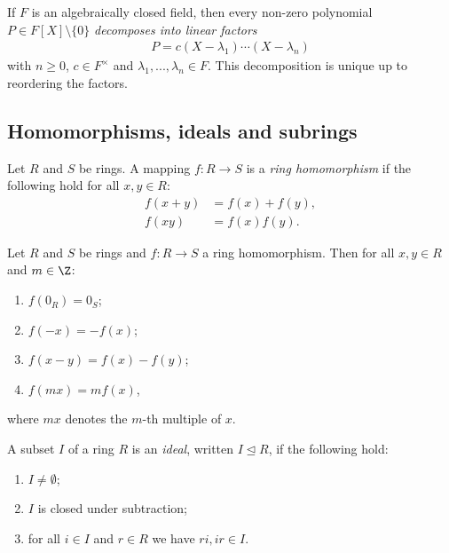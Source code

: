 \documentclass{article}
\begin{document}
\begin{theorem}[Notes 3.3.14]
    If $F$ is an algebraically closed field, then every non-zero polynomial
    $P\in F[X]\setminus\{0\}$ \emph{decomposes into linear factors}
    \begin{align*}
        P=c(X-\lambda_1)\cdots(X-\lambda_n)
    \end{align*} 
    with $n\geq 0$, $c\in F^\times$ and $\lambda_1,...,\lambda_n\in F$. This 
    decomposition is unique up to reordering the factors.
\end{theorem}

\subsection{Homomorphisms, ideals and subrings}

\begin{definition}
    Let $R$ and $S$ be rings. A mapping $f:R\to S$ is a \emph{ring homomorphism} if 
    the following hold for all $x,y\in R$:
    \begin{align*}
        f(x+y) & = f(x) + f(y), \\
        f(xy)  & = f(x)f(y).
    \end{align*}
\end{definition}

\begin{lemma}[Notes 3.4.5]
    Let $R$ and $S$ be rings and $f:R\to S$ a ring homomorphism. Then for all $x,y\in R$ 
    and $m\in\Z$:
    \begin{enumerate}
        \item $f(0_R)=0_S$;
        \item $f(-x)=-f(x)$;
        \item $f(x-y)=f(x)-f(y)$;
        \item $f(mx)=mf(x)$,
    \end{enumerate} 
    where $mx$ denotes the $m$-th multiple of $x$.
\end{lemma}

\begin{definition}
    A subset $I$ of a ring $R$ is an \emph{ideal}, written $I\trianglelefteq R$, if 
    the following hold:
    \begin{enumerate}
        \item $I\not=\emptyset$;
        \item $I$ is closed under subtraction;
        \item for all $i\in I$ and $r\in R$ we have $ri,ir\in I$.
    \end{enumerate}
\end{definition}
\end{document}
